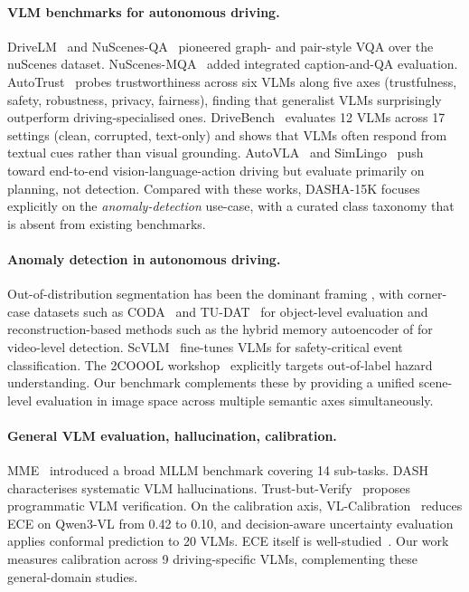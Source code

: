 \documentclass{article}
\newcommand{\bench}{\textsc{DASHA-15K}\xspace}
\begin{document}
\paragraph{VLM benchmarks for autonomous driving.}
DriveLM~\citep{drivelm} and NuScenes-QA~\citep{nuscenes_qa} pioneered
graph- and pair-style VQA over the nuScenes dataset.
NuScenes-MQA~\citep{nuscenes_mqa} added integrated caption-and-QA
evaluation. AutoTrust~\citep{autotrust} probes trustworthiness across
six VLMs along five axes (trustfulness, safety, robustness, privacy,
fairness), finding that generalist VLMs surprisingly outperform
driving-specialised ones. DriveBench~\citep{drivebench} evaluates 12
VLMs across 17 settings (clean, corrupted, text-only) and shows that
VLMs often respond from textual cues rather than visual
grounding. AutoVLA~\citep{autovla} and SimLingo~\citep{simlingo} push
toward end-to-end vision-language-action driving but evaluate primarily
on planning, not detection. Compared with these works, \bench focuses
explicitly on the \emph{anomaly-detection} use-case, with a curated
class taxonomy that is absent from existing benchmarks.

\paragraph{Anomaly detection in autonomous driving.}
Out-of-distribution segmentation has been the dominant framing
\citep{ood_seg_survey}, with corner-case datasets such as
CODA~\citep{coda} and TU-DAT~\citep{tudat} for object-level evaluation
and reconstruction-based methods such as the hybrid memory autoencoder
of \citet{hybrid_vad} for video-level detection.
ScVLM~\citep{scvlm} fine-tunes VLMs for safety-critical event
classification. The 2COOOL workshop~\citep{twocoool} explicitly targets
out-of-label hazard understanding. Our benchmark complements these by
providing a unified scene-level evaluation in image space across
multiple semantic axes simultaneously.

\paragraph{General VLM evaluation, hallucination, calibration.}
MME~\citep{mme} introduced a broad MLLM benchmark covering 14
sub-tasks. DASH~\citep{dash} characterises systematic VLM
hallucinations. Trust-but-Verify~\citep{trust_but_verify} proposes
programmatic VLM verification. On the calibration axis,
VL-Calibration~\citep{vl_calibration} reduces ECE on Qwen3-VL from 0.42
to 0.10, and decision-aware uncertainty
evaluation~\citep{decision_aware_unc} applies conformal prediction to
20 VLMs. ECE itself is well-studied~\citep{ece_understanding}. Our
work measures calibration across 9 driving-specific VLMs, complementing
these general-domain studies.
\end{document}
